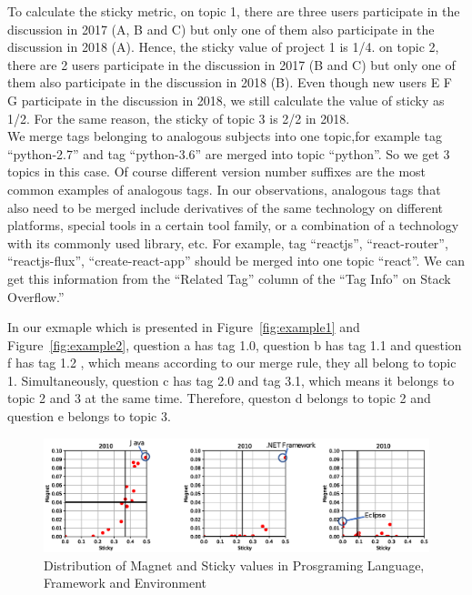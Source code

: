 \documentclass[english,preprint,JIP]{ipsj}
\begin{document}
To calculate the sticky metric, on topic 1, there are three users participate in the discussion in 2017 (A, B and C) but only one of them also participate in the discussion in 2018 (A). Hence, the sticky value of project 1 is 1/4. on topic 2, there are 2 users participate in the discussion in 2017 (B and C) but only one of them also participate in the discussion in 2018 (B). Even though new users E F G participate in the discussion in 2018, we still calculate the value of sticky as 1/2. For the same reason, the sticky of topic 3 is 2/2 in 2018.\\

We merge tags belonging to analogous subjects into one topic,for example tag ``python-2.7'' and tag ``python-3.6'' are merged into topic ``python''. So we get 3 topics in this case. 
Of course different version number suffixes are the most common examples of analogous tags. In our observations, analogous tags that also need to be merged include derivatives of the same technology on different platforms, special tools in a certain tool family, or a combination of a technology with its commonly used library, etc. For example, tag ``reactjs'', ``react-router'', ``reactjs-flux'', ``create-react-app'' should be merged into one topic ``react''.
We can get this information from the ``Related Tag'' column of the ``Tag Info'' on Stack Overflow.''

In our exmaple which is presented in Figure~\ref{fig:example1} and Figure~\ref{fig:example2},  question a has tag 1.0, question b has tag 1.1 and question f has tag 1.2 , which means according to our merge rule, they all belong to topic 1.  Simultaneously, question c has tag 2.0 and tag 3.1, which means it belongs to topic 2 and 3 at the same time. Therefore, queston d belongs to topic 2 and question e belongs to topic 3.


\begin{figure}[t]
 \centering
 \includegraphics[width=1.0\hsize]{img/2010all.eps}  
 \caption{Distribution of Magnet and Sticky values in Prosgraming Language, Framework and Environment} 
 \label{fig:2010} 
\end{figure}
\smallskip
\end{document}
